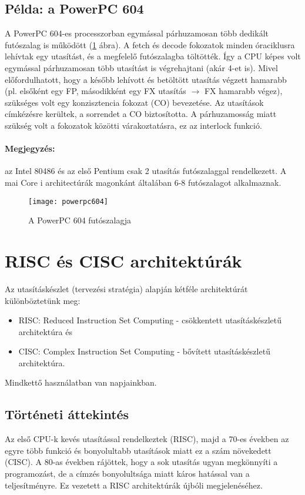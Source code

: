 \subsection{Példa: a PowerPC 604}
A PowerPC 604-es processzorban egymással párhuzamosan több dedikált futószalag is működött (\ref{fig:powerpc604} ábra).
A fetch és decode fokozatok minden óraciklusra lehívtak egy utasítást, és a megfelelő futószalagba töltötték.
Így a CPU képes volt egymással párhuzamosan több utasítást is végrehajtani (akár 4-et is).
Mivel előfordulhatott, hogy a később lehívott és betöltött utasítás végzett hamarabb (pl. elsőként egy FP, másodikként egy FX utasítás $\rightarrow$ FX hamarabb végez), szükséges volt egy konzisztencia fokozat (CO) bevezetése.
Az utasítások címkézésre kerültek, a sorrendet a CO biztosította.
A párhuzamosság miatt szükség volt a fokozatok közötti várakoztatásra, ez az interlock funkció.
\paragraph{Megjegyzés:} az Intel 80486 és az első Pentium csak 2 utasítás futószalaggal rendelkezett. A mai Core i architectúrák magonkánt általában 6-8 futószalagot alkalmaznak.
\label{powerpc604}
\begin{figure}[H]
    \texttt{[image: powerpc604]}
    \centering
    \caption{A PowerPC 604 futószalagja}
    \label{fig:powerpc604}
\end{figure}

\section{RISC és CISC architektúrák}
Az utasításkészlet (tervezési stratégia) alapján kétféle architektúrát különböztetünk meg:
\begin{itemize}
    \item RISC: Reduced Instruction Set Computing - csökkentett utasításkészletű architektúra és
    \item CISC: Complex Instruction Set Computing - bővített utasításkészletű architektúra.
\end{itemize}
Mindkettő használatban van napjainkban.
\subsection{Történeti áttekintés}
Az első CPU-k kevés utasítással rendelkeztek (RISC), majd a 70-es években az egyre több funkció és bonyolultabb utasítások miatt ez a szám növekedett (CISC).
A 80-as években rájöttek, hogy a sok utasítás ugyan megkönnyíti a programozást, de a címzés bonyolultsága miatt káros hatással van a teljesítményre.
Ez vezetett a RISC architektúrák újbóli megjelenéséhez.
